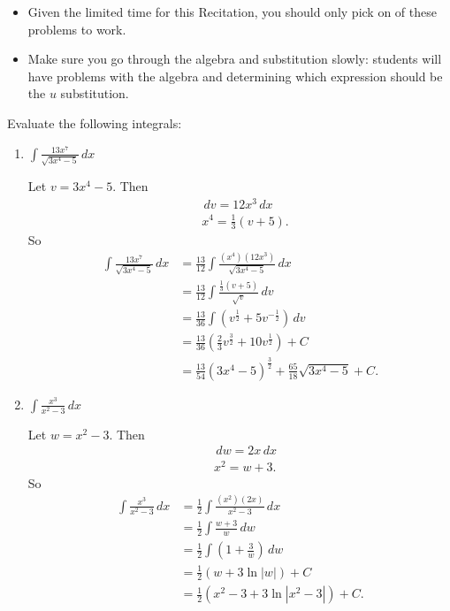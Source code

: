 \documentclass[nooutcomes, handout]{ximera}
\renewcommand{\d}{\,d}
\begin{document}
\begin{problem}
\mbox{}
\begin{itemize}
  \item Given the limited time for this Recitation, you should only
    pick on of these problems to work.
  \item Make sure you go through the algebra and substitution slowly:
    students will have problems with the algebra and determining which
    expression should be the $u$ substitution.
  \end{itemize}
Evaluate the following integrals:

	\begin{enumerate}
	
	\item  $\int \frac{13x^7}{\sqrt{3x^4-5}} \d x$
		\begin{freeResponse}
		Let $v = 3x^4 - 5$.  Then
			\begin{align*}
			&\d v = 12 x^3 \d x  \\
			&x^4 = \frac{1}{3} (v + 5).
			\end{align*}
		So
			\begin{align*}
			\int \frac{13x^7}{\sqrt{3x^4-5}} \d x &= \frac{13}{12} \int \frac{(x^4)(12 x^3)}{\sqrt{3x^4-5}} \d x  \\
			&= \frac{13}{12} \int \frac{\frac{1}{3} (v+5)}{\sqrt{v}} \d v  \\
			&= \frac{13}{36} \int \left( v^{\frac{1}{2}} + 5v^{-\frac{1}{2}} \right) \d v  \\
			&= \frac{13}{36} \left( \frac{2}{3} v^{\frac{3}{2}} + 10 v^{\frac{1}{2}} \right) + C  \\
			&= \frac{13}{54} (3x^4-5)^{\frac{3}{2}} + \frac{65}{18} \sqrt{3x^4 - 5} + C.
			\end{align*}
		\end{freeResponse}
		
		
		
	\item  $\int \frac{x^3}{x^2 - 3} \d x$
		\begin{freeResponse}
		Let $w = x^2 - 3$.  Then
			\begin{align*}
			&\d w = 2x \d x  \\
			&x^2 = w + 3.
			\end{align*}
		So
			\begin{align*}
			\int \frac{x^3}{x^2 - 3} \d x &= \frac{1}{2} \int \frac{(x^2)(2x)}{x^2 - 3} \d x  \\
			&= \frac{1}{2} \int \frac{w+3}{w} \d w  \\
			&= \frac{1}{2} \int \left(1 + \frac{3}{w} \right) \d w  \\
			&= \frac{1}{2} \left( w + 3 \ln|w| \right) + C  \\
			&= \frac{1}{2} \left( x^2 - 3 + 3\ln|x^2-3| \right) + C.
			\end{align*}
		\end{freeResponse}
		
		
		
	\end{enumerate}
			
			
	
\end{problem}
\end{document}

